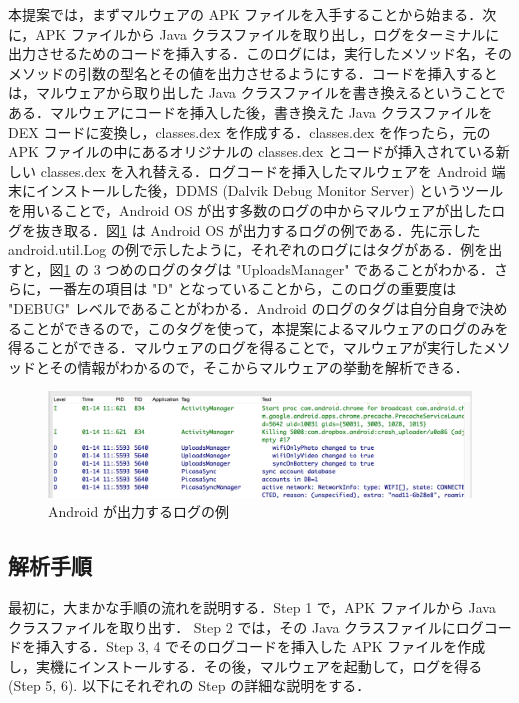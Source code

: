 本提案では，まずマルウェアの APK ファイルを入手することから始まる．次に，APK ファイルから Java クラスファイルを取り出し，ログをターミナルに出力させるためのコードを挿入する．このログには，実行したメソッド名，そのメソッドの引数の型名とその値を出力させるようにする．コードを挿入するとは，マルウェアから取り出した Java クラスファイルを書き換えるということである．マルウェアにコードを挿入した後，書き換えた Java クラスファイルを DEX コードに変換し，classes.dex を作成する．classes.dex を作ったら，元の APK ファイルの中にあるオリジナルの classes.dex とコードが挿入されている新しい classes.dex を入れ替える．ログコードを挿入したマルウェアを Android 端末にインストールした後，DDMS (Dalvik Debug Monitor Server) というツールを用いることで，Android OS が出す多数のログの中からマルウェアが出したログを抜き取る．図\ref{examplelog} は Android OS が出力するログの例である．先に示した android.util.Log の例で示したように，それぞれのログにはタグがある．例を出すと，図\ref{examplelog} の 3 つめのログのタグは "UploadsManager" であることがわかる．さらに，一番左の項目は "D"  となっていることから，このログの重要度は "DEBUG" レベルであることがわかる．Android のログのタグは自分自身で決めることができるので，このタグを使って，本提案によるマルウェアのログのみを得ることができる．マルウェアのログを得ることで，マルウェアが実行したメソッドとその情報がわかるので，そこからマルウェアの挙動を解析できる．

\begin{figure}[t]
\begin{center}
\includegraphics[scale=0.2]{androidlogexample.eps}
\end{center}
\caption{Android が出力するログの例}
\label{examplelog}
\end{figure}

\subsection{解析手順}
\label{analysismethod}
最初に，大まかな手順の流れを説明する．Step 1 で，APK ファイルから Java クラスファイルを取り出す． Step 2 では，その Java クラスファイルにログコードを挿入する．Step 3, 4  でそのログコードを挿入した APK ファイルを作成し，実機にインストールする．その後，マルウェアを起動して，ログを得る (Step 5, 6). 以下にそれぞれの Step の詳細な説明をする．

